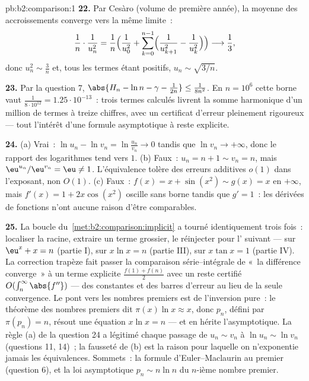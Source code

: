 \begin{solution}{pb:b2:comparison:1}
\textbf{22.} Par Cesàro (volume de première année), la moyenne des
accroissements converge vers la même limite~:
\[
\frac{1}{n}\cdot\frac{1}{u_n^2}
= \frac1n\Bigl(\frac1{u_0^2} + \sum_{k=0}^{n-1}
\Bigl(\frac1{u_{k+1}^2} - \frac1{u_k^2}\Bigr)\Bigr)
\longrightarrow \frac13 ,
\]
donc $u_n^2 \sim \frac3n$ et, tous les termes étant positifs, $u_n
\sim \sqrt{3/n}$.

\textbf{23.} Par la question 7, $\abs{H_n - \ln n - \gamma -
\frac1{2n}} \leq \frac1{8n^2}$. En $n = 10^6$ cette borne vaut
$\frac{1}{8\cdot10^{12}} = 1.25\cdot10^{-13}$~: trois termes calculés
livrent la somme harmonique d'un million de termes à treize
chiffres, avec un certificat d'erreur pleinement rigoureux --- tout
l'intérêt d'une formule asymptotique à reste explicite.

\textbf{24.} (a) Vrai~: $\ln u_n - \ln v_n = \ln\frac{u_n}{v_n}
\to 0$ tandis que $\ln v_n \to +\infty$, donc le rapport des
logarithmes tend vers $1$. (b) Faux~: $u_n = n + 1 \sim v_n = n$, mais
$\eu^{u_n}/\eu^{v_n} = \eu \neq 1$. L'équivalence tolère des
erreurs additives $o(1)$ dans l'exposant, non $O(1)$. (c) Faux~:
$f(x) = x + \sin(x^2) \sim g(x) = x$ en $+\infty$, mais $f'(x)
= 1 + 2x\cos(x^2)$ oscille sans borne tandis que $g' = 1$~:
les dérivées de fonctions  n'ont aucune raison d'être
comparables.

\textbf{25.} La boucle du~\cref{met:b2:comparison:implicit} a tourné
identiquement trois fois~: localiser la racine, extraire un terme
grossier, le réinjecter pour l' suivant --- sur $\eu^x + x = n$
(partie I), sur $x\ln x = n$ (partie III), sur $x\tan x = 1$ (partie
IV). La correction trapèze fait passer la comparaison série--intégrale
de «~la différence converge~» à un terme explicite $\frac{f(1) +
f(n)}2$ avec un reste certifié $O(\int_n^\infty
\abs{f''})$ --- des constantes et des barres d'erreur au lieu de la
seule convergence. Le pont vers les nombres premiers est de l'inversion
pure~: le théorème des nombres premiers dit $\pi(x)\ln x \approx x$,
donc $p_n$, défini par $\pi(p_n) = n$, résout une équation $x\ln x = n$
--- et en hérite l'asymptotique. La règle (a) de la question 24 a
légitimé chaque passage de $u_n \sim v_n$ à $\ln u_n \sim
\ln v_n$ (questions 11, 14)~; la fausseté de (b) est la raison pour
laquelle on n'exponentie jamais les équivalences. Sommets~: la formule
d'Euler--Maclaurin au premier  (question 6), et la loi asymptotique
$p_n \sim n\ln n$ du $n$-ième nombre premier.
\end{solution}
